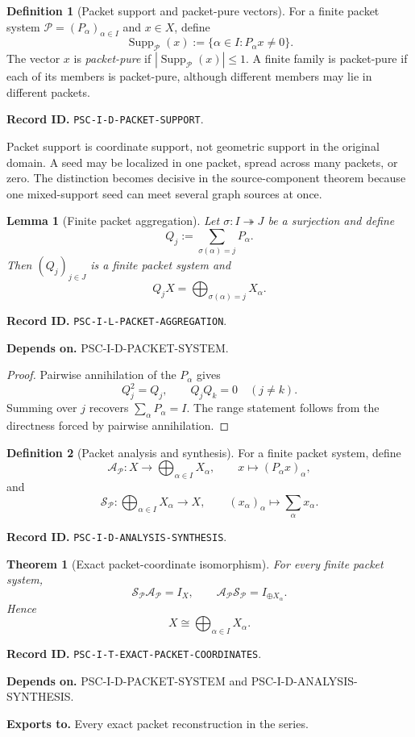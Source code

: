 \documentclass[11pt]{article}
\newtheorem{theorem}{Theorem}[section]
\newtheorem{lemma}[lemma]{Lemma}
\theoremstyle{definition}
\newtheorem{definition}[definition]{Definition}
\theoremstyle{remark}
\newcommand{\Pcal}{\mathcal P}
\newcommand{\Supp}{\operatorname{Supp}}
\newcommand{\RecordID}[1]{\par\smallskip\noindent\begingroup\footnotesize\color{PSCGray}\raggedright\textbf{Record ID.} \nolinkurl{#1}.\par\endgroup}
\newcommand{\Depends}[1]{\par\noindent\begingroup\footnotesize\color{PSCGray}\raggedright\textbf{Depends on.} #1\par\endgroup}
\newcommand{\Exports}[1]{\par\noindent\begingroup\footnotesize\color{PSCGray}\raggedright\textbf{Exports to.} #1\par\endgroup}
\begin{document}
\begin{definition}[Packet support and packet-pure vectors]
\label{def:packet-support}
For a finite packet system \(\Pcal=(P_\alpha)_{\alpha\in I}\) and \(x\in X\), define
\[
\Supp_{\Pcal}(x)
:=
\{\alpha\in I:P_\alpha x\neq0\}.
\]
The vector \(x\) is \emph{packet-pure} if \(|\Supp_{\Pcal}(x)|\leq1\).  A finite family is packet-pure if each of its members is packet-pure, although different members may lie in different packets.
\end{definition}
\RecordID{PSC-I-D-PACKET-SUPPORT}

\begin{interpretation}
Packet support is coordinate support, not geometric support in the original domain.  A seed may be localized in one packet, spread across many packets, or zero.  The distinction becomes decisive in the source-component theorem because one mixed-support seed can meet several graph sources at once.
\end{interpretation}


\begin{lemma}[Finite packet aggregation]
\label{lem:packet-aggregation}
Let $\sigma:I\twoheadrightarrow J$ be a surjection and define
\[
Q_j:=\sum_{\sigma(\alpha)=j}P_\alpha.
\]
Then $(Q_j)_{j\in J}$ is a finite packet system and
\[
Q_jX=\bigoplus_{\sigma(\alpha)=j}X_\alpha.
\]
\end{lemma}
\RecordID{PSC-I-L-PACKET-AGGREGATION}
\Depends{PSC-I-D-PACKET-SYSTEM.}

\begin{proof}
Pairwise annihilation of the $P_\alpha$ gives
\[
Q_j^2=Q_j,
\qquad
Q_jQ_k=0\quad(j\neq k).
\]
Summing over $j$ recovers $\sum_\alpha P_\alpha=I$.  The range statement follows from the directness forced by pairwise annihilation.
\end{proof}

\begin{definition}[Packet analysis and synthesis]
\label{def:analysis-synthesis}
For a finite packet system, define
\[
\mathcal A_{\Pcal}:X\longrightarrow\bigoplus_{\alpha\in I}X_\alpha,
\qquad
x\longmapsto(P_\alpha x)_\alpha,
\]
and
\[
\mathcal S_{\Pcal}:\bigoplus_{\alpha\in I}X_\alpha\longrightarrow X,
\qquad
(x_\alpha)_\alpha\longmapsto\sum_\alpha x_\alpha.
\]
\end{definition}
\RecordID{PSC-I-D-ANALYSIS-SYNTHESIS}

\begin{theorem}[Exact packet-coordinate isomorphism]
\label{thm:exact-packet-coordinates}
For every finite packet system,
\[
\boxed{
\mathcal S_{\Pcal}\mathcal A_{\Pcal}=I_X,
\qquad
\mathcal A_{\Pcal}\mathcal S_{\Pcal}=I_{\oplus X_\alpha}.
}
\]
Hence
\[
\boxed{X\cong\bigoplus_{\alpha\in I}X_\alpha.}
\]
\end{theorem}
\RecordID{PSC-I-T-EXACT-PACKET-COORDINATES}
\Depends{PSC-I-D-PACKET-SYSTEM and PSC-I-D-ANALYSIS-SYNTHESIS.}
\Exports{Every exact packet reconstruction in the series.}
\end{document}
